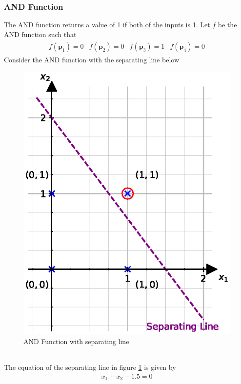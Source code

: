 \subsubsection*{AND Function}
The AND function returns a value of 1 if both of the inputs is 1. Let $f$ be the AND function such that
\begin{align}
\begin{matrix}
  \nonumber
  f(\textbf{p}_1) = 0 & f(\textbf{p}_2) = 0 & f(\textbf{p}_3) = 1 & f(\textbf{p}_4) = 0
\end{matrix}  
\end{align}
Consider the AND function with the separating line below
\begin{figure}[ht]
  \centering
  \includegraphics[scale=0.75]{CHAPTER_2/c2_fig_AND_function_python.eps}
  \caption{AND Function with separating line}
  \label{AND_function_2}
\end{figure}\\
The equation of the separating line in figure \ref{AND_function_2} is given by
\begin{align}
  x_1 + x_2 -1.5 = 0
\end{align}
